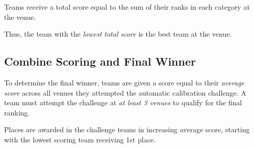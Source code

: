 Teams receive a total score equal to the sum of their ranks in each category at the venue. 

Thus, the team with the \textit{lowest total score} is the best team at the venue.

\subsection{Combine Scoring and Final Winner}
To determine the final winner, teams are given a score equal to their \textit{average score} across all venues they attempted the automatic calibration challenge. A team must attempt the challenge at \textit{at least 3 venues} to qualify for the final ranking.

Places are awarded in the challenge teams in increasing average score, starting with the lowest scoring team receiving 1st place.

